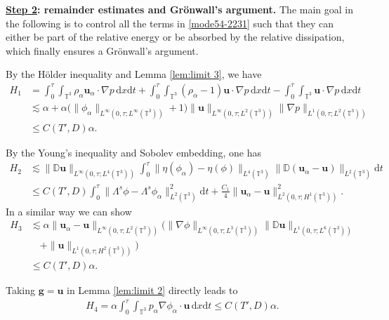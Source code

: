 \documentclass[reqno,a4paper,11pt]{amsart}
\theoremstyle{plain}
\numberwithin{equation}{section}
\newcommand{\bb}[1]{\mathbb{#1}}
\newcommand{\bbt}{\bb{T}}
\renewcommand{\d}{\mathrm{d}}
\newcommand{\dx}{\d x}
\newcommand{\dt}{\d t}
\begin{document}
				\textbf{\underline{Step 2}: remainder estimates and Gr\"onwall's argument.}
				The main goal in the following is to control all the terms in \eqref{mode54-2231} such that they can either be part of the relative energy or be absorbed by the relative dissipation, which finally ensures a Gr\"onwall's argument.
				
				By the H\"{o}lder inequality and Lemma \ref{lem:limit 3}, we have
				\begin{align}
					\label{mode54-224}
					\nonumber H_{1}&=
					\int_0^\tau\int_{\mathbb{T}^{3}}  \rho_{\alpha}\mathbf{u}_{\alpha}\cdot \nabla p\,\dx\dt+\int_0^\tau\int_{\mathbb{T}^{3}}  (\rho_{\alpha}-1)\mathbf{u}\cdot \nabla p\,\dx\dt-\int_0^\tau\int_{\mathbb{T}^{3}}  \mathbf{u}\cdot \nabla p\,\dx\dt
					\\&\nonumber \lesssim \alpha
					+ \alpha\big(\|\phi_{\alpha}\|_{L^{\infty}(0,\tau;L^{\infty}(\mathbb{T}^{3}))}+1\big)\|\mathbf{u}\|_{L^{\infty}(0,\tau;L^{2}(\mathbb{T}^{3}))}\| \nabla p\|_{L^{1}(0,\tau;L^{2}(\mathbb{T}^{3}))}
					\\&\leq C(T',D)\alpha.
				\end{align}
				
				By the Young's inequality and Sobolev embedding, one has
				\begin{align}
					\label{mode54-2241}
					\nonumber H_{2}
					&\lesssim \|\mathbb{ D}\mathbf{u}\|_{L^{\infty}(0,\tau;L^{4}(\mathbb{T}^{3}))}\int_0^\tau\|\eta(\phi_{\alpha})-\eta(\phi)\|_{L^{4}(\mathbb{T}^{3})}
					\|\mathbb{ D}(\mathbf{u}_{\alpha}-\mathbf{u})\|_{L^{2}(\mathbb{T}^{3})}\dt
					\\&\leq C(T',D)\int_0^\tau\|\Lambda^s\phi-\Lambda^s\phi_{\alpha}\|_{L^{2}(\bbt^3)}^2\dt+\frac{C_1}{4} \| \mathbf{u}_{\alpha}-\mathbf{u}\|_{L^2(0,\tau;H^{1}(\mathbb{T}^{3}))}^{2}.
				\end{align}
				In a similar way we can show
				\begin{align}
					\label{mode54-225}
					\nonumber H_{3}
					&\lesssim\nonumber \alpha\|\mathbf{u}_{\alpha}-\mathbf{u}\|_{L^{\infty}(0,\tau;L^{2}(\mathbb{T}^{3}))}(\|\nabla\phi\|_{L^{\infty}(0,\tau;L^{3}(\mathbb{T}^{3}))}
					\|\mathbb{ D}\mathbf{u}\|_{L^{1}(0,\tau;L^{6}(\mathbb{T}^{3}))}
					\\&\nonumber\quad+
					\|\mathbf{u}\|_{L^{1}(0,\tau;H^{2}(\mathbb{T}^{3}))})
					\\&\leq C(T',D)\alpha.
				\end{align}
				
				
				Taking $\mathbf{g}=\mathbf{u}$ in Lemma \ref{lem:limit 2} directly leads to
				\begin{align}
					\label{mode54-226}
					H_{4}=\alpha\int_0^\tau\int_{\mathbb{T}^{3}}p_{\alpha}\nabla\phi_{\alpha} \cdot \mathbf{u}\,\dx\dt\leq C(T',D)\alpha.
				\end{align}
				
\end{document}
